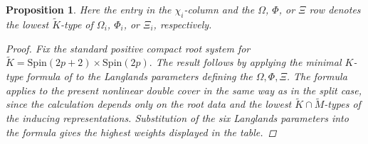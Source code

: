 \documentclass{amsart}
\newcommand{\Spin}{{\mathrm{Spin}}}
\newtheorem{prop}[thm]{Proposition}
\theoremstyle{definition}
\newcommand{\tu}{\widetilde}
\begin{document}
\begin{prop}
Here the entry in the \(\chi_i\)-column and the \(\Omega\), \(\Phi\), or
\(\Xi\) row denotes the lowest \(\tu K\)-type of
\(\Omega_i\), \(\Phi_i\), or \(\Xi_i\), respectively.

\begin{proof}
Fix the standard positive compact root system for
$\tu K=\Spin(2p+2)\times\Spin(2p).$
The result follows by applying the minimal \(K\)-type formula of
\cite{Kn86} to the Langlands parameters defining
the $\Omega, \Phi, \Xi$. 
The formula applies to the present nonlinear double cover in the same way as
in the split case, since the calculation depends only on the root data and
the lowest \(\tu K\cap\tu M\)-types of the inducing representations.
Substitution of the six Langlands parameters into the formula gives the
highest weights displayed in the table.
\end{proof}


\end{prop}
\end{document}
